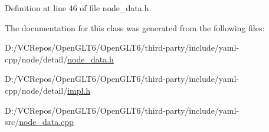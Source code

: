 Definition at line 46 of file node\+\_\+data.\+h.



The documentation for this class was generated from the following files\+:\begin{DoxyCompactItemize}
\item 
D\+:/\+V\+C\+Repos/\+Open\+G\+L\+T6/\+Open\+G\+L\+T6/third-\/party/include/yaml-\/cpp/node/detail/\mbox{\hyperlink{node__data_8h}{node\+\_\+data.\+h}}\item 
D\+:/\+V\+C\+Repos/\+Open\+G\+L\+T6/\+Open\+G\+L\+T6/third-\/party/include/yaml-\/cpp/node/detail/\mbox{\hyperlink{detail_2impl_8h}{impl.\+h}}\item 
D\+:/\+V\+C\+Repos/\+Open\+G\+L\+T6/\+Open\+G\+L\+T6/third-\/party/include/yaml-\/src/\mbox{\hyperlink{node__data_8cpp}{node\+\_\+data.\+cpp}}\end{DoxyCompactItemize}
